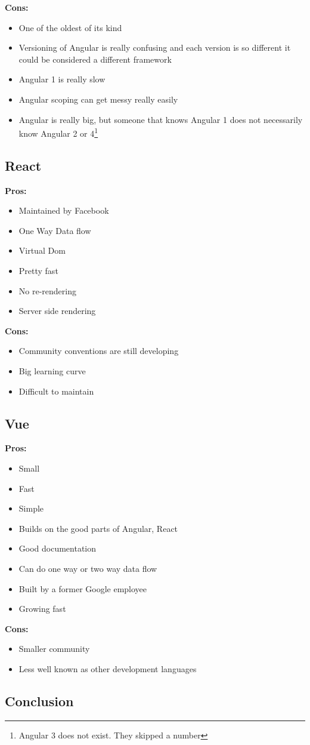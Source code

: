 \documentclass[draftclsnofoot,onecolumn,letterpaper,10pt,compsoc]{IEEEtran}
\begin{document}
    \textbf{Cons:}
    \begin{itemize}
      \item One of the oldest of its kind
      \item Versioning of Angular is really confusing and each version is so different it could be considered a different framework
      \item Angular 1 is really slow
      \item Angular scoping can get messy really easily
      \item Angular is really big, but someone that knows Angular 1 does not necessarily know Angular 2 or 4\footnote{Angular 3 does not exist. They skipped a number}
    \end{itemize}


	\subsection{React}
    \textbf{Pros:}
    \begin{itemize}
      \item Maintained by Facebook
      \item One Way Data flow
      \item Virtual Dom
      \item Pretty fast
      \item No re-rendering
      \item Server side rendering
    \end{itemize}

    \textbf{Cons:}
    \begin{itemize}
      \item Community conventions are still developing
      \item Big learning curve
      \item Difficult to maintain
    \end{itemize}


  \subsection{Vue}

    \textbf{Pros:}
    \begin{itemize}
      \item Small
      \item Fast
      \item Simple
      \item Builds on the good parts of Angular, React
      \item Good documentation
      \item Can do one way or two way data flow
      \item Built by a former Google employee
      \item Growing fast
    \end{itemize}

    \textbf{Cons:}
    \begin{itemize}
      \item Smaller community
      \item Less well known as other development languages
    \end{itemize}

  \subsection{Conclusion}


{}

\end{document}
